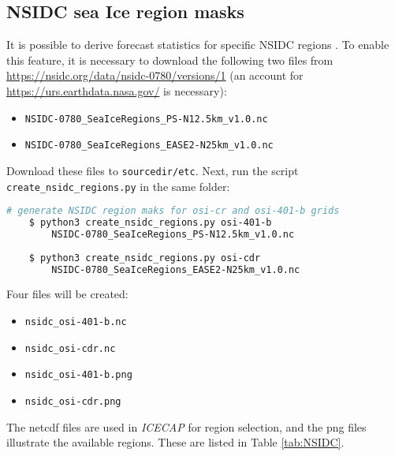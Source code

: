 \documentclass[DIV=10, parskip=full]{scrreprt}
\newcommand{\ice}{\textit{ICECAP}\xspace}
\begin{document}
\subsection{NSIDC sea Ice region masks}
\label{sec:nsidc}
It is possible to derive forecast statistics for specific NSIDC regions \citep{Meier2023}. To enable this feature, it is necessary to download the following two files from \url{https://nsidc.org/data/nsidc-0780/versions/1} (an account for \url{https://urs.earthdata.nasa.gov/} is necessary):
\begin{itemize}
	\item \texttt{NSIDC-0780\_SeaIceRegions\_PS-N12.5km\_v1.0.nc} 
	\item  \texttt{NSIDC-0780\_SeaIceRegions\_EASE2-N25km\_v1.0.nc} 
\end{itemize}

Download these files to \texttt{sourcedir/etc}. Next, run the script \texttt{create\_nsidc\_regions.py} in the same folder:

  \begin{lstlisting}[language=bash]
	# generate NSIDC region maks for osi-cr and osi-401-b grids
	$ python3 create_nsidc_regions.py osi-401-b 
		NSIDC-0780_SeaIceRegions_PS-N12.5km_v1.0.nc
	
	$ python3 create_nsidc_regions.py osi-cdr 
		NSIDC-0780_SeaIceRegions_EASE2-N25km_v1.0.nc
\end{lstlisting}

Four files will be created:
\begin{itemize}
	\item \texttt{nsidc\_osi-401-b.nc}
	\item \texttt{nsidc\_osi-cdr.nc}
	\item \texttt{nsidc\_osi-401-b.png}
	\item \texttt{nsidc\_osi-cdr.png}
\end{itemize}

The netcdf files are used in \ice for region selection, and the png files illustrate the available regions. These are listed in Table \ref{tab:NSIDC}.  \\
\end{document}

